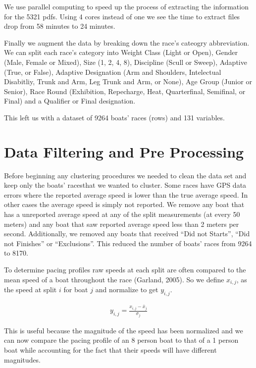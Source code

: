 \documentclass[11pt,]{article}
\begin{document}
We use parallel computing to speed up the process of extracting the
information for the 5321 pdfs. Using 4 cores instead of one we see the
time to extract files drop from 58 minutes to 24 minutes.

Finally we augment the data by breaking down the race's cateogry
abbreviation. We can split each race's category into Weight Class (Light
or Open), Gender (Male, Female or Mixed), Size (1, 2, 4, 8), Discipline
(Scull or Sweep), Adaptive (True, or False), Adaptive Designation (Arm
and Shoulders, Intelectual Disabitliy, Trunk and Arm, Leg Trunk and Arm,
or None), Age Group (Junior or Senior), Race Round (Exhibition,
Repecharge, Heat, Quarterfinal, Semifinal, or Final) and a Qualifier or
Final designation.

This left us with a dataset of 9264 boats' races (rows) and 131
variables.

\section{Data Filtering and Pre
Processing}\label{data-filtering-and-pre-processing}

Before beginning any clustering procedures we needed to clean the data
set and keep only the boats' racesthat we wanted to cluster. Some races
have GPS data errors where the reported average speed is lower than the
true average speed. In other cases the average speed is simply not
reported. We remove any boat that has a unreported average speed at any
of the split measurements (at every 50 meters) and any boat that saw
reported average speed less than 2 meters per second. Additionally, we
removed any boats that received ``Did not Starts'', ``Did not Finishes''
or ``Exclusions''. This reduced the number of boats' races from 9264 to
8170.

To determine pacing profiles raw speeds at each split are often compared
to the mean speed of a boat throughout the race (Garland, 2005). So we
define \(x_{i,j}\), as the speed at split \(i\) for boat \(j\) and
normalize to get \(y_{i,j}\).

\begin{align*}
    y_{i,j} = \frac{x_{i,j} - \bar{x}_{j}}{\sigma_{j}}
\end{align*}

This is useful because the magnitude of the speed has been normalized
and we can now compare the pacing profile of an 8 person boat to that of
a 1 person boat while accounting for the fact that their speeds will
have different magnitudes.
\end{document}
